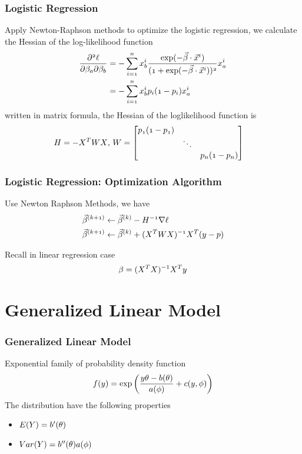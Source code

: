 \documentclass[notheorems, aspectratio=54]{beamer}
\begin{document}
\begin{frame}

\frametitle{Logistic Regression}
Apply Newton-Raphson methods to optimize the logistic regression, we calculate the Hessian of the log-likelihood function
\begin{align*}
\mathnormal{\frac{\partial^2\ell}{\partial\beta_a\partial\beta_b}}
&=\mathnormal{-\sum_{i=1}^{n}x_b^i\frac{\exp(-\vec{\beta}\cdot\vec{x}^i)}{(1+\exp(-\vec{\beta}\cdot\vec{x}^i))^2}x_a^i}\\
&=\mathnormal{-\sum_{i=1}^{n}x_b^i p_i (1-p_i)x_a^i}\\
\end{align*}
written in matrix formula, the Hessian of the loglikelihood function is
\begin{align*}
\mathnormal{{H}}&=\mathnormal{-X^TWX}\text{, } 
\mathnormal{W}=  \begin{bmatrix}
    \mathnormal{p_1 (1-p_1)} & & \\
    & \ddots & \\
    & & \mathnormal{p_n (1-p_n)}
  \end{bmatrix}
\end{align*}
\end{frame}

\begin{frame}
\frametitle{Logistic Regression: Optimization Algorithm}
Use Newton Raphson Methods, we have
\begin{align*}
\mathnormal{\vec{\beta}^{(k+1)}} &\leftarrow \mathnormal{\vec{\beta}^{(k)}-{H}^{-1}\nabla\ell}\\
\mathnormal{\vec{\beta}^{(k+1)}} &\leftarrow \mathnormal{\vec{\beta}^{(k)}+({X}^T{W}{X})^{-1}{X}^T({y}-{p})}
\end{align*}

Recall in linear regression case
$$
\beta=(\mathnormal{X^T}\mathnormal{X})^{-1}\mathnormal{X^{T}}\mathnormal{y}
$$
\end{frame}


\section{Generalized Linear Model}

\begin{frame}
\frametitle{Generalized Linear Model}
Exponential family of probability density function
$$
\mathnormal{f(y)}=\exp\mathnormal{\left( \frac{y\theta-b(\theta)}{a(\phi)}+c(y, \phi)\right)}
$$
The distribution have the following properties
\begin{itemize}
\item $\mathnormal{E(Y)}=\mathnormal{b'(\theta)}$
\item $\mathnormal{Var(Y)}=\mathnormal{b''(\theta)a(\phi)}$
\end{itemize}
\end{frame}
\end{document}
